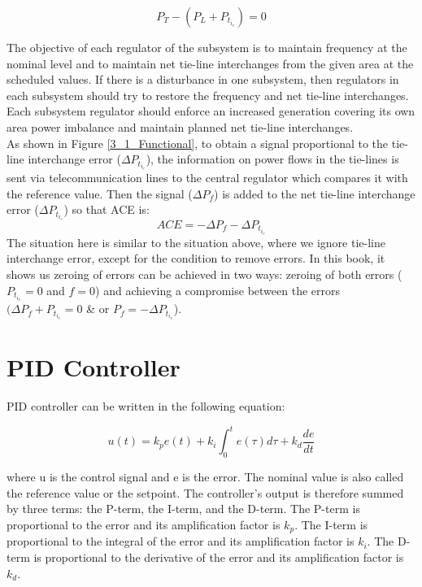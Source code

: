 \documentclass{report}
\begin{document}
\begin{equation} \label{eq1}
 P_T - (P_L + P_t_i_e) = 0
\end{equation}

The objective of each regulator of the subsystem is to maintain frequency at the nominal level and to maintain net tie-line interchanges from the given area at the scheduled values. If there is a disturbance in one subsystem, then regulators in each subsystem should try to restore the frequency and net tie-line interchanges. Each subsystem regulator should enforce an increased generation covering its own area power imbalance and maintain planned net tie-line interchanges.\\

As shown in Figure \textcolor{red}{\ref{3_1_Functional}}, to obtain a signal proportional to the tie-line interchange error ($\Delta P_t_i_e$), the information on power ﬂows in the tie-lines is sent via telecommunication lines to the central regulator which compares it with the reference value. Then the signal ($\Delta P_f$) is added to the net tie-line interchange error ($\Delta P_t_i_e$) so that ACE is: 
\begin{equation} \label{eq2}
 ACE = −\Delta P_f − \Delta P_t_i_e 
\end{equation}
The situation here is similar to the situation above, where we ignore tie-line interchange error, except for the condition to remove errors. In this book, it shows us zeroing of errors can be achieved in two ways: zeroing of both errors ($ P_t_i_e = 0 $ and $ f = 0 $) and achieving a compromise between the errors $(\Delta P_f + P_t_i_e = 0 $ & or $ P_f = - \Delta P_t_i_e $).\\



\section{PID Controller} %
PID controller can be written in the following equation:

\begin{equation} \label{eq3}
 u(t) = k_p e(t) + k_i \int_{0}^{t} e(\tau) d\tau + k_d \frac{d e}{d t}
\end{equation}

 where u is the control signal and e is the error. The nominal value is also called the reference value or the setpoint. The controller’s output is therefore summed by three terms: the P-term, the I-term, and the D-term. The P-term is proportional to the error and its amplification factor is $k_p$. The I-term is proportional to the integral of the error and its amplification factor is $k_i$. The D-term is proportional to the derivative of the error and its amplification factor is $k_d$.\\
 
\end{document}
